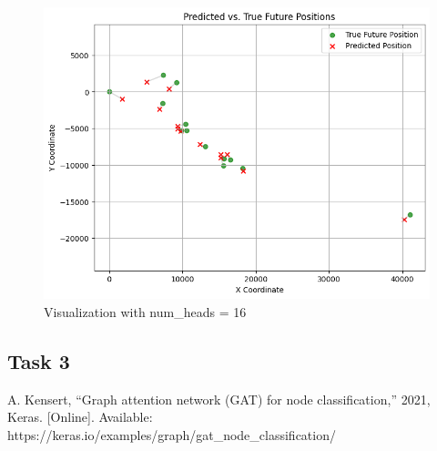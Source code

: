 \documentclass[conference]{IEEEtran}
\begin{document}
\begin{figure}[htbp]
    \centering
    \includegraphics[width=0.8\linewidth]{figvisual2.png}
    \caption{Visualization with num\_heads = 16}
    \label{fig:visual2}
\end{figure}

\subsection*{Task 3}



\begin{thebibliography}{00}
 A. Kensert, “Graph attention network (GAT) for node
    classification,” 2021, Keras. [Online]. Available:
    https://keras.io/examples/graph/gat\_node\_classification/
\end{thebibliography}
\end{document}

